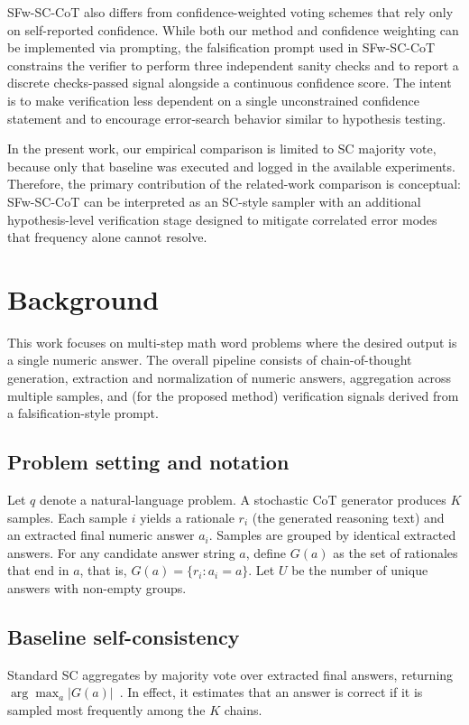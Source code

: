 \documentclass[journal,article,accept,pdftex,moreauthors]{Definitions/mdpi}
\begin{document}
SFw-SC-CoT also differs from confidence-weighted voting schemes that rely only on self-reported confidence. While both our method and confidence weighting can be implemented via prompting, the falsification prompt used in SFw-SC-CoT constrains the verifier to perform three independent sanity checks and to report a discrete checks-passed signal alongside a continuous confidence score. The intent is to make verification less dependent on a single unconstrained confidence statement and to encourage error-search behavior similar to hypothesis testing.

In the present work, our empirical comparison is limited to SC majority vote, because only that baseline was executed and logged in the available experiments. Therefore, the primary contribution of the related-work comparison is conceptual: SFw-SC-CoT can be interpreted as an SC-style sampler with an additional hypothesis-level verification stage designed to mitigate correlated error modes that frequency alone cannot resolve.

\section{Background}

This work focuses on multi-step math word problems where the desired output is a single numeric answer. The overall pipeline consists of chain-of-thought generation, extraction and normalization of numeric answers, aggregation across multiple samples, and (for the proposed method) verification signals derived from a falsification-style prompt.

\subsection{Problem setting and notation}
Let $q$ denote a natural-language problem. A stochastic CoT generator produces $K$ samples. Each sample $i$ yields a rationale $r_i$ (the generated reasoning text) and an extracted final numeric answer $a_i$. Samples are grouped by identical extracted answers. For any candidate answer string $a$, define $G(a)$ as the set of rationales that end in $a$, that is, $G(a) = \{ r_i : a_i = a \}$. Let $U$ be the number of unique answers with non-empty groups.

\subsection{Baseline self-consistency}
Standard SC aggregates by majority vote over extracted final answers, returning $\arg\max_a |G(a)|$~\cite{das-2022-self}. In effect, it estimates that an answer is correct if it is sampled most frequently among the $K$ chains.
\end{document}
